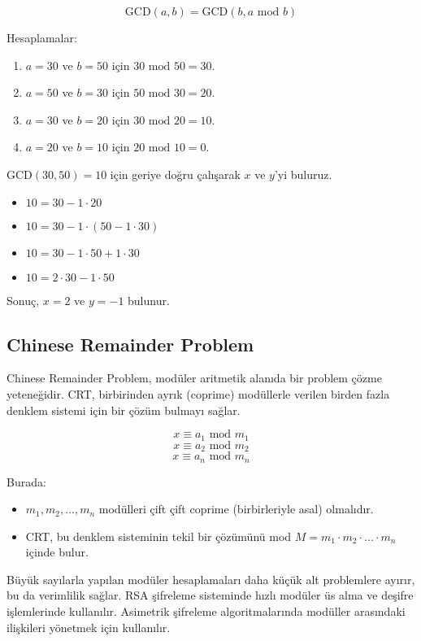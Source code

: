 \[ \text{GCD}(a, b) = \text{GCD}(b, a \text{ mod } b) \]

Hesaplamalar:

\begin{enumerate}
    \item $a = 30$ ve $b = 50$ için $30 \text{ mod } 50 = 30$.
    \item $a = 50$ ve $b = 30$ için $50 \text{ mod } 30 = 20$.
    \item $a = 30$ ve $b = 20$ için $30 \text{ mod } 20 = 10$.
    \item $a = 20$ ve $b = 10$ için $20 \text{ mod } 10 = 0 $.
\end{enumerate}

$\text{GCD}(30, 50) = 10$ için geriye doğru çalışarak $x$ ve $y$'yi buluruz.

\begin{itemize}
    \item $10 = 30 - 1 \cdot 20$
    \item $10 = 30 - 1 \cdot (50 - 1 \cdot 30)$
    \item $10 = 30 - 1 \cdot 50 + 1 \cdot 30$
    \item $10 = 2 \cdot 30 - 1 \cdot 50$
\end{itemize}

Sonuç, $x = 2$ ve $y = -1$ bulunur.

\newpage

\subsection{Chinese Remainder Problem}

Chinese Remainder Problem, modüler aritmetik alanıda bir problem çözme yeteneğidir. CRT, birbirinden ayrık (coprime) modüllerle verilen birden fazla denklem sistemi için bir çözüm bulmayı sağlar.

\[ x \equiv a_1 \text{ mod } m_1 \]
\[ x \equiv a_2 \text{ mod } m_2 \]
\[ x \equiv a_n \text{ mod } m_n \]

Burada:

\begin{itemize}
    \item $m_1, m_2, ..., m_n$ modülleri çift çift coprime (birbirleriyle asal) olmalıdır.
    \item CRT, bu denklem sisteminin tekil bir çözümünü mod $M = m_1 \cdot m_2 \cdot ... \cdot m_n$ içinde bulur.
\end{itemize}

Büyük sayılarla yapılan modüler hesaplamaları daha küçük alt problemlere ayırır, bu da verimlilik sağlar. RSA şifreleme sisteminde hızlı modüler üs alma ve deşifre işlemlerinde kullanılır. Asimetrik şifreleme algoritmalarında modüller arasındaki ilişkileri yönetmek için kullanılır.

